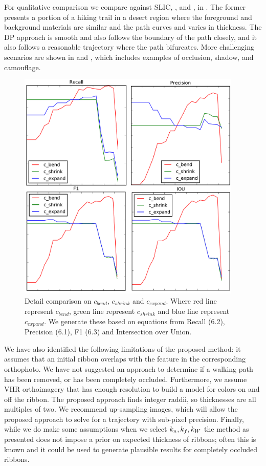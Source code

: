 For qualitative comparison we compare against \ac{SLIC}, \ActiveContours{}, and \GrabCut{}, in
. The former presents a portion of a hiking trail in a desert region where the foreground and background materials are similar and the path curves and varies in thickness. The \ac{DP} approach is smooth and also follows the boundary of the path closely, and it also follows a reasonable trajectory where the path bifurcates. More challenging scenarios are shown in  and , which includes examples of occlusion, shadow, and camouflage.  

\begin{figure}[H]
    \centering
    \includegraphics[width=0.95\textwidth]{Figures/changes_on_recall.png}
    \caption[Parameters Evaluation]{Detail comparison on $c_{bend}$, $c_{shrink}$ and $c_{expand}$. Where red line represent $c_{bend}$, green line represent $c_{shrink}$ and blue line represent $c_{expand}$. We generate these based on equations from Recall (6.2), Precision (6.1), F1 (6.3) and Intersection over Union.}
    \label{fig:change_on_recall}
\end{figure}

We have also identified the following limitations of the proposed method: it assumes that an initial ribbon overlaps with the feature in the corresponding orthophoto. We have not suggested an approach to determine if a walking path has been removed, or has been completely occluded. Furthermore, we assume \ac{VHR} orthoimagery that has enough resolution to build a model for colors on and off the ribbon. The proposed approach finds integer raddii, so thicknesses are all multiples of two. We recommend up-sampling images, which will allow the proposed approach to solve for a trajectory with sub-pixel precision. Finally, while we do make some assumptions when we select $k_n{}, k_f{}, k_W{}$ the method as presented does not impose a prior on expected thickness of ribbons; often this is known and it could be used to generate plausible results for completely occluded ribbons.

